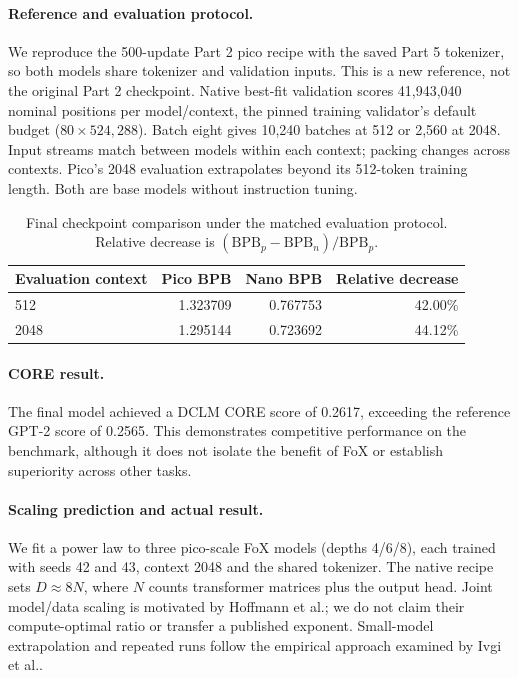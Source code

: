 \documentclass[11pt]{article}
\begin{document}
\paragraph{Reference and evaluation protocol.}
We reproduce the 500-update Part 2 pico recipe with the saved Part 5 tokenizer,
so both models share tokenizer and validation inputs. This is a new reference,
not the original Part 2 checkpoint. Native best-fit validation scores
41,943,040 nominal positions per model/context, the pinned training validator's
default budget ($80\times524{,}288$). Batch eight gives 10,240 batches at 512
or 2,560 at 2048. Input streams match between models within each context;
packing changes across contexts. Pico's 2048 evaluation extrapolates beyond
its 512-token training length. Both are base models without instruction tuning.

\begin{table}[htbp]
\centering\small
\begin{tabular}{lrrr}
\hline
Evaluation context & Pico BPB & Nano BPB & Relative decrease \\
\hline
512 & 1.323709 & 0.767753 & 42.00\% \\
2048 & 1.295144 & 0.723692 & 44.12\% \\
\hline
\end{tabular}
\caption{Final checkpoint comparison under the matched evaluation protocol.
Relative decrease is $(\mathrm{BPB}_{p}-\mathrm{BPB}_{n})/\mathrm{BPB}_{p}$.}
\label{tab:p5-bpb}
\end{table}

\paragraph{CORE result.}
The final model achieved a DCLM CORE score of 0.2617, exceeding the reference GPT-2 score of 0.2565. This demonstrates competitive performance on the benchmark, although it does not isolate the benefit of FoX or establish superiority across other tasks.


\paragraph{Scaling prediction and actual result.}
We fit a power law to three pico-scale FoX models (depths 4/6/8), each trained
with seeds 42 and 43, context 2048 and the shared tokenizer. The native recipe
sets $D\approx8N$, where $N$ counts transformer matrices plus the output head.
Joint model/data scaling is motivated by Hoffmann et al.\cite{p5-hoffmann};
we do not claim their compute-optimal ratio or transfer a published exponent.
Small-model extrapolation and repeated runs follow the empirical approach
examined by Ivgi et al.\cite{p5-ivgi}.
\end{document}
